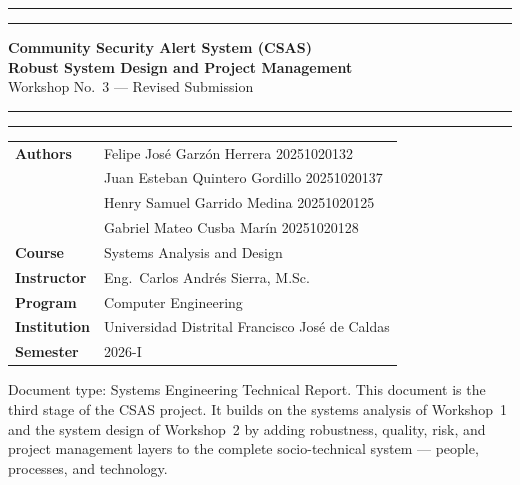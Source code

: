 \documentclass[12pt,a4paper]{article}
\begin{document}
\begin{titlepage}
\centering\vspace*{1.5cm}
{\color{udblue}\rule{\linewidth}{1.5pt}}\vspace{4pt}
{\color{udgold}\rule{\linewidth}{4pt}}\vspace{16pt}

{\LARGE\bfseries\color{udblue}Community Security Alert System (CSAS)}\\\vspace{6pt}
{\large\bfseries Robust System Design and Project Management}\\\vspace{4pt}
{\large Workshop No.\ 3 --- Revised Submission}\\\vspace{16pt}

{\color{udgold}\rule{\linewidth}{4pt}}\vspace{4pt}
{\color{udblue}\rule{\linewidth}{1.5pt}}\vspace{24pt}

\begin{tabular}{ll}
\textbf{Authors} & Felipe José Garzón Herrera \hfill 20251020132\\
& Juan Esteban Quintero Gordillo \hfill 20251020137\\
& Henry Samuel Garrido Medina \hfill 20251020125\\
& Gabriel Mateo Cusba Marín \hfill 20251020128\\[8pt]
\textbf{Course} & Systems Analysis and Design\\
\textbf{Instructor} & Eng.\ Carlos Andrés Sierra, M.Sc.\\
\textbf{Program} & Computer Engineering\\
\textbf{Institution} & Universidad Distrital Francisco José de Caldas\\
\textbf{Semester} & 2026-I\\
\end{tabular}

\vfill
{\small\color{gray}
Document type: Systems Engineering Technical Report.
This document is the third stage of the CSAS project.
It builds on the systems analysis of Workshop~1 and the
system design of Workshop~2 by adding robustness, quality,
risk, and project management layers to the complete
socio-technical system — people, processes, and technology.}
\end{titlepage}
\end{document}
